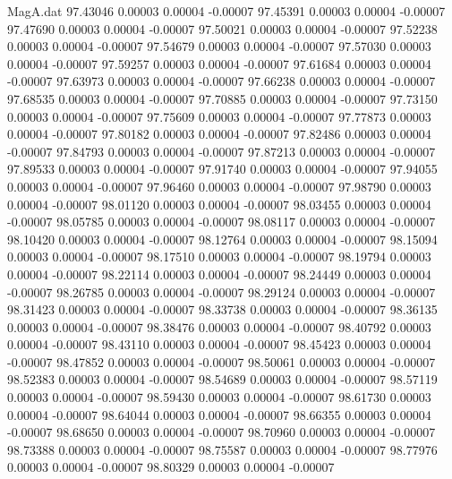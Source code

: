 \begin{filecontents}{MagA.dat}
  97.43046    0.00003    0.00004   -0.00007
  97.45391    0.00003    0.00004   -0.00007
  97.47690    0.00003    0.00004   -0.00007
  97.50021    0.00003    0.00004   -0.00007
  97.52238    0.00003    0.00004   -0.00007
  97.54679    0.00003    0.00004   -0.00007
  97.57030    0.00003    0.00004   -0.00007
  97.59257    0.00003    0.00004   -0.00007
  97.61684    0.00003    0.00004   -0.00007
  97.63973    0.00003    0.00004   -0.00007
  97.66238    0.00003    0.00004   -0.00007
  97.68535    0.00003    0.00004   -0.00007
  97.70885    0.00003    0.00004   -0.00007
  97.73150    0.00003    0.00004   -0.00007
  97.75609    0.00003    0.00004   -0.00007
  97.77873    0.00003    0.00004   -0.00007
  97.80182    0.00003    0.00004   -0.00007
  97.82486    0.00003    0.00004   -0.00007
  97.84793    0.00003    0.00004   -0.00007
  97.87213    0.00003    0.00004   -0.00007
  97.89533    0.00003    0.00004   -0.00007
  97.91740    0.00003    0.00004   -0.00007
  97.94055    0.00003    0.00004   -0.00007
  97.96460    0.00003    0.00004   -0.00007
  97.98790    0.00003    0.00004   -0.00007
  98.01120    0.00003    0.00004   -0.00007
  98.03455    0.00003    0.00004   -0.00007
  98.05785    0.00003    0.00004   -0.00007
  98.08117    0.00003    0.00004   -0.00007
  98.10420    0.00003    0.00004   -0.00007
  98.12764    0.00003    0.00004   -0.00007
  98.15094    0.00003    0.00004   -0.00007
  98.17510    0.00003    0.00004   -0.00007
  98.19794    0.00003    0.00004   -0.00007
  98.22114    0.00003    0.00004   -0.00007
  98.24449    0.00003    0.00004   -0.00007
  98.26785    0.00003    0.00004   -0.00007
  98.29124    0.00003    0.00004   -0.00007
  98.31423    0.00003    0.00004   -0.00007
  98.33738    0.00003    0.00004   -0.00007
  98.36135    0.00003    0.00004   -0.00007
  98.38476    0.00003    0.00004   -0.00007
  98.40792    0.00003    0.00004   -0.00007
  98.43110    0.00003    0.00004   -0.00007
  98.45423    0.00003    0.00004   -0.00007
  98.47852    0.00003    0.00004   -0.00007
  98.50061    0.00003    0.00004   -0.00007
  98.52383    0.00003    0.00004   -0.00007
  98.54689    0.00003    0.00004   -0.00007
  98.57119    0.00003    0.00004   -0.00007
  98.59430    0.00003    0.00004   -0.00007
  98.61730    0.00003    0.00004   -0.00007
  98.64044    0.00003    0.00004   -0.00007
  98.66355    0.00003    0.00004   -0.00007
  98.68650    0.00003    0.00004   -0.00007
  98.70960    0.00003    0.00004   -0.00007
  98.73388    0.00003    0.00004   -0.00007
  98.75587    0.00003    0.00004   -0.00007
  98.77976    0.00003    0.00004   -0.00007
  98.80329    0.00003    0.00004   -0.00007

\end{filecontents}
